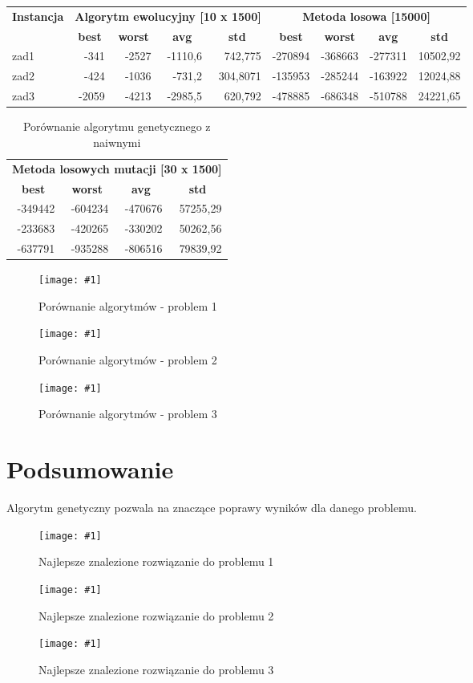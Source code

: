 \documentclass[12pt,a4paper]{article}
\newcommand{\image}[2] {
    \begin{figure}[H]
        \begin{center}
            \texttt{[image: \#1]}
        \end{center}
        \caption{#2}
        \label{#1}
    \end{figure}
}
\begin{document}
\begin{table}[htbp]
  \centering
    \begin{tabular}{l|rrrr|rrrr|}
    \multicolumn{1}{c|}{\textbf{Instancja}} & \multicolumn{4}{c|}{\textbf{Algorytm ewolucyjny [10 x 1500]}} & \multicolumn{4}{c|}{\textbf{Metoda losowa [15000]}} \\
          & \multicolumn{1}{c}{\textbf{best}} & \multicolumn{1}{c}{\textbf{worst}} & \multicolumn{1}{c}{\textbf{avg}} & \multicolumn{1}{c|}{\textbf{std}} & \multicolumn{1}{c}{\textbf{best}} & \multicolumn{1}{c}{\textbf{worst}} & \multicolumn{1}{c}{\textbf{avg}} & \multicolumn{1}{c|}{\textbf{std}} \\
    \midrule
    zad1  & -341  & -2527 & -1110,6 & 742,775 & -270894 & -368663 & -277311 & 10502,92 \\
    zad2  & -424  & -1036 & -731,2 & 304,8071 & -135953 & -285244 & -163922 & 12024,88 \\
    zad3  & -2059 & -4213 & -2985,5 & 620,792 & -478885 & -686348 & -510788 & 24221,65 \\
    \end{tabular}%
  \label{tab:addlabel}%
\end{table}%
\begin{table}[htbp]
  \centering
    \begin{tabular}{|rrrr}
    \multicolumn{4}{|c}{\textbf{Metoda losowych mutacji [30 x 1500]}} \\
    \multicolumn{1}{|c}{\textbf{best}} & \multicolumn{1}{c}{\textbf{worst}} & \multicolumn{1}{c}{\textbf{avg}} & \multicolumn{1}{c}{\textbf{std}} \\
    \midrule
    -349442 & -604234 & -470676 & 57255,29 \\
    -233683 & -420265 & -330202 & 50262,56 \\
    -637791 & -935288 & -806516 & 79839,92 \\
    \end{tabular}%
  \caption{Porównanie algorytmu genetycznego z naiwnymi}
  \label{tab:addlabel}%
\end{table}%



\image{images/Porównanie algorytmów_1}{Porównanie algorytmów - problem 1}
\image{images/Porównanie algorytmów_2}{Porównanie algorytmów - problem 2}
\image{images/Porównanie algorytmów_3}{Porównanie algorytmów - problem 3}

\section{Podsumowanie}
Algorytm genetyczny pozwala na znaczące poprawy wyników dla danego problemu.
\image{images/solution1}{Najlepsze znalezione rozwiązanie do problemu 1}
\image{images/solution2}{Najlepsze znalezione rozwiązanie do problemu 2}
\image{images/solution3}{Najlepsze znalezione rozwiązanie do problemu 3}
\end{document}
